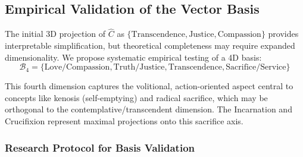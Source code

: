 \documentclass[11pt,a4paper]{article}
\theoremstyle{definition}
\theoremstyle{remark}
\begin{document}
\subsection{Empirical Validation of the Vector Basis}

The initial 3D projection of \(\hat{C}\) as \(\{\text{Transcendence}, \text{Justice}, \text{Compassion}\}\) provides interpretable simplification, but theoretical completeness may require expanded dimensionality. We propose systematic empirical testing of a 4D basis:
\begin{equation}
\mathcal{B}_4 = \{\text{Love/Compassion}, \text{Truth/Justice}, \text{Transcendence}, \text{Sacrifice/Service}\}
\end{equation}

This fourth dimension captures the volitional, action-oriented aspect central to concepts like kenosis (self-emptying) and radical sacrifice, which may be orthogonal to the contemplative/transcendent dimension. The Incarnation and Crucifixion represent maximal projections onto this sacrifice axis.

\subsubsection{Research Protocol for Basis Validation}
\end{document}
